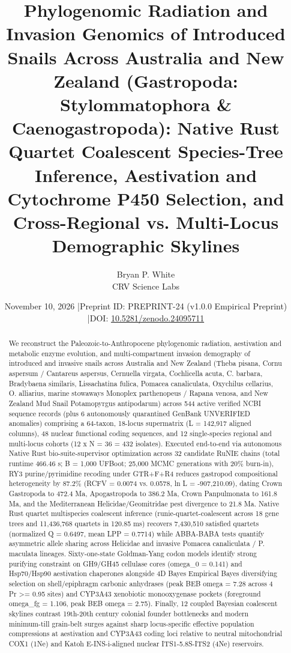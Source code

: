 \documentclass[10pt,letterpaper]{article}
\title{Phylogenomic Radiation and Invasion Genomics of Introduced Snails Across Australia and New Zealand (Gastropoda: Stylommatophora \& Caenogastropoda): Native Rust Quartet Coalescent Species-Tree Inference, Aestivation and Cytochrome P450 Selection, and Cross-Regional vs. Multi-Locus Demographic Skylines}
\author{Bryan P. White \\ CRV Science Labs}
\date{November 10, 2026 \quad|\quad Preprint ID: PREPRINT-24 (v1.0.0 Empirical Preprint) \quad|\quad DOI: \href{https://doi.org/10.5281/zenodo.24095711}{10.5281/zenodo.24095711}}
\begin{document}
\maketitle
\begin{abstract}
We reconstruct the Paleozoic-to-Anthropocene phylogenomic radiation, aestivation and metabolic enzyme evolution, and multi-compartment invasion demography of introduced and invasive snails across Australia and New Zealand (Theba pisana, Cornu aspersum / Cantareus aspersus, Cernuella virgata, Cochlicella acuta, C. barbara, Bradybaena similaris, Lissachatina fulica, Pomacea canaliculata, Oxychilus cellarius, O. alliarius, marine stowaways Monoplex parthenopeus / Rapana venosa, and New Zealand Mud Snail Potamopyrgus antipodarum) across 544 active verified NCBI sequence records (plus 6 autonomously quarantined GenBank UNVERIFIED anomalies) comprising a 64-taxon, 18-locus supermatrix (L = 142,917 aligned columns), 48 nuclear functional coding sequences, and 12 single-species regional and multi-locus cohorts (12 x N = 36 = 432 isolates). Executed end-to-end via autonomous Native Rust bio-suite-supervisor optimization across 32 candidate RuNIE chains (total runtime 466.46 s; B = 1,000 UFBoot; 25,000 MCMC generations with 20\% burn-in), RY3 purine/pyrimidine recoding under GTR+F+R4 reduces gastropod compositional heterogeneity by 87.2\% (RCFV = 0.0074 vs. 0.0578, ln L = -907,210.09), dating Crown Gastropoda to 472.4 Ma, Apogastropoda to 386.2 Ma, Crown Panpulmonata to 161.8 Ma, and the Mediterranean Helicidae/Geomitridae pest divergence to 21.8 Ma. Native Rust quartet multispecies coalescent inference (runie-quartet-coalescent across 18 gene trees and 11,436,768 quartets in 120.85 ms) recovers 7,430,510 satisfied quartets (normalized Q = 0.6497, mean LPP = 0.7714) while ABBA-BABA tests quantify asymmetric allele sharing across Helicidae and invasive Pomacea canaliculata / P. maculata lineages. Sixty-one-state Goldman-Yang codon models identify strong purifying constraint on GH9/GH45 cellulase cores (omega\_0 = 0.141) and Hsp70/Hsp90 aestivation chaperones alongside 4D Bayes Empirical Bayes diversifying selection on shell/epiphragm carbonic anhydrases (peak BEB omega = 7.28 across 4 Pr >= 0.95 sites) and CYP3A43 xenobiotic monooxygenase pockets (foreground omega\_fg = 1.106, peak BEB omega = 2.75). Finally, 12 coupled Bayesian coalescent skylines contrast 19th-20th century colonial founder bottlenecks and modern minimum-till grain-belt surges against sharp locus-specific effective population compressions at aestivation and CYP3A43 coding loci relative to neutral mitochondrial COX1 (1Ne) and Katoh E-INS-i-aligned nuclear ITS1-5.8S-ITS2 (4Ne) reservoirs.
\end{abstract}
\end{document}
